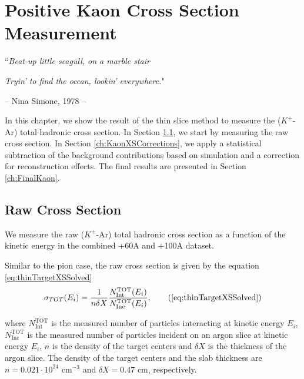 \chapter{Positive Kaon Cross Section Measurement}\label{ch:KaonXS}
{\raggedleft ``\emph{Beat-up little seagull, on a marble stair} \par}
{\raggedleft \emph{Tryin' to find the ocean, lookin' everywhere.}"\par}
{\raggedleft -- Nina Simone, 1978 -- \par}%
\vspace{0.5cm}

In this chapter, we show the result of the thin slice method to measure  the ($K^+$-Ar) total hadronic cross section. In Section \ref{ch:KaonXSRaw}, we start by measuring the raw cross section. In Section \ref{ch:KaonXSCorrections}, we apply a statistical subtraction of the background contributions based on simulation and a correction for reconstruction effects. The final results are presented in Section \ref{ch:FinalKaon}.


\section{Raw Cross Section}\label{ch:KaonXSRaw}
We measure the raw ($K^+$-Ar) total hadronic cross section as a function of the kinetic energy in the combined +60A and +100A dataset. 

Similar to the pion case,  the raw cross section is given by the equation \ref{eq:thinTargetXSSolved}
\begin{equation}
 \sigma_{TOT} (E_i)  = \frac{1}{n \delta X}\frac{N^{\text{TOT}}_{\text{Int}}(E_i)}{N^{\text{TOT}}_{\text{Inc}}(E_i)}, \tag{\ref{eq:thinTargetXSSolved}}
\end{equation}

where $N^{\text{TOT}}_{\text{Int}}$  is the measured number of particles interacting at kinetic energy $E_i$, $N^{\text{TOT}}_{\text{Inc}}$ is the  measured  number of particles incident  on an argon slice at  kinetic energy $E_i$,  $n$ is the density of the target centers  and $\delta X$ is the thickness of the argon slice. The density of the target centers and the slab thickness are $n = 0.021\cdot10^{24} \text{ cm}^{-3} $ and  $\delta X=0.47\text{ cm}$, respectively.


